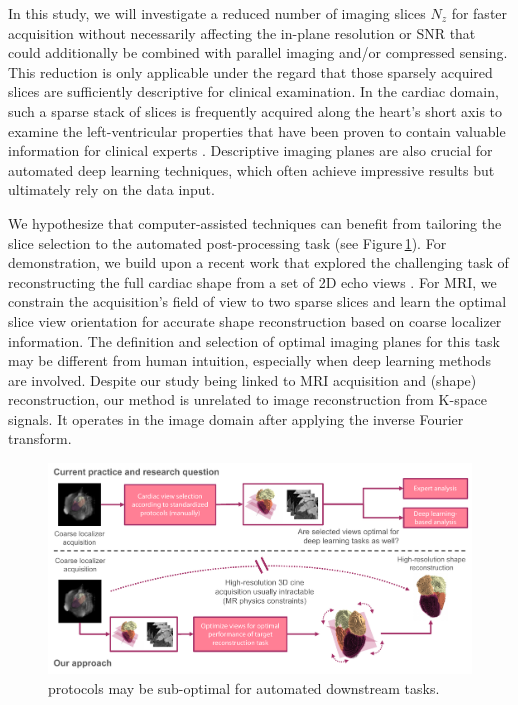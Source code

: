     In this study, we will investigate a reduced number of imaging slices $N_z$ for faster acquisition without necessarily affecting the in-plane resolution or SNR that could additionally be combined with parallel imaging and/or compressed sensing.
    This reduction is only applicable under the regard that those sparsely acquired slices are sufficiently descriptive for clinical examination.
    In the cardiac domain, such a sparse stack of slices is frequently acquired along the heart's short axis to examine the left-ventricular properties that have been proven to contain valuable information for clinical experts \cite{american2002standardized}. Descriptive imaging planes are also crucial for automated deep learning techniques, which often achieve impressive results but ultimately rely on the data input.

    We hypothesize that computer-assisted techniques can benefit from tailoring the slice selection to the automated post-processing task (see Figure\,\ref{fig:problem_setup}).
    For demonstration, we build upon a recent work that explored the challenging task of reconstructing the full cardiac shape from a set of 2D echo views \cite{stojanovski2022efficient}. For MRI, we constrain the acquisition's field of view to two sparse slices and learn the optimal slice view orientation for accurate shape reconstruction based on coarse localizer information.
    The definition and selection of optimal imaging planes \cite{watkins2013cardiovascular,american2002standardized,ismail2022cardiac} for this task may be different from human intuition, especially when deep learning methods are involved. Despite our study being linked to MRI acquisition and (shape) reconstruction, our method is unrelated to image reconstruction from K-space signals. It operates in the image domain after applying the inverse Fourier transform.


        \begin{figure}[H]
        \includegraphics[width=0.95\linewidth]{figures/problem_setup.pdf}
        \caption{ protocols may be sub-optimal for automated downstream tasks. }
    \label{fig:problem_setup}
    \end{figure}


